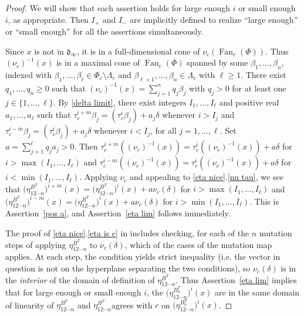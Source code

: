 \documentclass{amsart}
\theoremstyle{definition}
\theoremstyle{remark}
\numberwithin{equation}{section}
\newcommand{\set}[1]{{\lbrace #1 \rbrace}}
\newcommand{\0}{{\mathbf{0}}}
\newcommand{\Fan}{\operatorname{Fan}}
\renewcommand{\d}{{\mathfrak d}}
\newcommand{\RSChar}{\Phi}
\newcommand{\RS}{\RSChar}
\newcommand{\AP}[1]{\RS_{#1}}
\newcommand{\APTChar}{\Lambda}
\newcommand{\APT}[1]{\APTChar_{#1}}
\newcommand{\sayN}[1]{\say[N]{#1}}
\begin{document}
\begin{proof}
We will show that each assertion holds for large enough $i$ or small enough $i$, as appropriate.
Then $I_+$ and $I_-$ are implicitly defined to realize ``large enough'' or ``small enough'' for all the assertions simultaneously.

Since $x$ is not in $\d_\infty$, it is in a full-dimensional cone of $\nu_c(\Fan_c(\RS))$.
Thus $(\nu_c)^{-1}(x)$ is in a maximal cone of $\Fan_c(\RS)$ spanned by some $\beta_1,\ldots,\beta_n$, indexed with $\beta_1,\ldots,\beta_\ell\in\AP{c}\setminus\APT{c}$ and $\beta_{\ell+1},\ldots,\beta_n\in\APT{c}$ with $\ell\ge1$.
There exist $q_1,\ldots,q_n\ge0$ such that $(\nu_c)^{-1}(x)=\sum_{j=1}^nq_j\beta_j$ with $q_j>0$ for at least one $j\in\set{1,\ldots,\ell}$.
By \cref{delta limit}, there exist integers $I_1,\ldots,I_\ell$ and positive real $a_1,\ldots,a_\ell$ such that $\tau_c^{i+m}\beta_j=(\tau_c^i\beta_j)+a_j\delta$ whenever $i>I_j$ and $\tau_c^{i-m}\beta_j=(\tau_c^i\beta_j)+a_j\delta$ whenever $i<I_j$, for all $j=1,\ldots,\ell$.
Set $a=\sum_{j=1}^\ell q_ja_j>0$.
Then $\tau_c^{i+m}((\nu_c)^{-1}(x))=\tau_c^i((\nu_c)^{-1}(x))+a\delta$ for $i>\max(I_1,\ldots,I_\ell)$ and $\tau_c^{i-m}((\nu_c)^{-1}(x))=\tau_c^i((\nu_c)^{-1}(x))+a\delta$ for $i<\min(I_1,\ldots,I_\ell)$.
Applying $\nu_c$ and appealing to \cref{eta nice}.\ref{nu tau}, we see that $\bigl(\eta_{12\cdots n}^{B^T}\bigr)^{i+m}(x)=\bigl(\eta_{12\cdots n}^{B^T}\bigr)^i(x)+a\nu_c(\delta)$ for $i>\max(I_1,\ldots,I_\ell)$ and $\bigl(\eta_{12\cdots n}^{B^T}\bigr)^{i-m}(x)=\bigl(\eta_{12\cdots n}^{B^T}\bigr)^i(x)+a\nu_c(\delta)$ for $i>\min(I_1,\ldots,I_\ell)$.
This is Assertion~\ref{pos a}, and Assertion~\ref{eta lim} follows immediately.

The proof of \cref{eta nice}.\ref{eta is c} in \cite[Proposition~7.31]{affscat} includes checking, for each of the $n$ mutation steps of applying $\eta^{B^T}_{12\cdots n}$ to $\nu_c(\delta)$, which of the cases of the mutation map applies.
At each step, the condition yields strict inequality (i.e. the vector in question is not on the hyperplane separating the two conditions), so $\nu_c(\delta)$ is in the \emph{interior} of the domain of definition of $\eta^{B^T}_{12\cdots n}$.
Thus Assertion~\ref{eta lim} implies that for large enough or small enough $i$, the $\bigl(\eta_{12\cdots n}^{B_0^T}\bigr)^i(x)$ are in the same domain of linearity \sayN{...of definition?}
of $\eta^{B^T}_{12\cdots n}$ and $\eta^{B^T}_{12\cdots n}$agrees with $c$ on $\bigl(\eta_{12\cdots n}^{B_0^T}\bigr)^i(x)$.


\end{proof}
\end{document}
